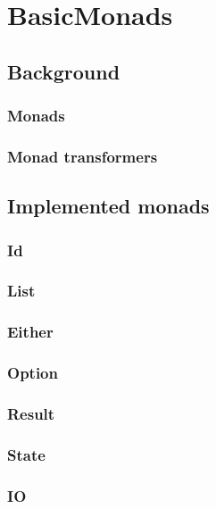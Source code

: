 \section{BasicMonads}
\subsection{Background}
\subsubsection{Monads}
\subsubsection{Monad transformers}
\subsection{Implemented monads}
\subsubsection{Id}
\subsubsection{List}
\subsubsection{Either}
\subsubsection{Option}
\subsubsection{Result}
\subsubsection{State}
\subsubsection{IO}

